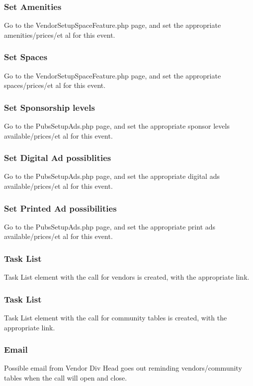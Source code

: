 \documentclass[captions=tablesignature]{scrartcl}
\begin{document}
\subsubsection{Set Amenities}
\label{sec-3-2-1}
Go to the VendorSetupSpaceFeature.php page, and set the
appropriate amenities/prices/et al for this event.

\subsubsection{Set Spaces}
\label{sec-3-2-2}
Go to the VendorSetupSpaceFeature.php page, and set the
appropriate spaces/prices/et al for this event.

\subsubsection{Set Sponsorship levels}
\label{sec-3-2-3}
Go to the PubsSetupAds.php page, and set the
appropriate sponsor levels available/prices/et al for this event.

\subsubsection{Set Digital Ad possiblities}
\label{sec-3-2-4}
Go to the PubsSetupAds.php page, and set the
appropriate digital ads available/prices/et al for this event.

\subsubsection{Set Printed Ad possibilities}
\label{sec-3-2-5}
Go to the PubsSetupAds.php page, and set the
appropriate print ads available/prices/et al for this event.

\subsubsection{Task List}
\label{sec-3-2-6}
Task List element with the call for vendors is created, with the
appropriate link.

\subsubsection{Task List}
\label{sec-3-2-7}
Task List element with the call for community tables is created,
with the appropriate link.

\subsubsection{Email}
\label{sec-3-2-8}
Possible email from Vendor Div Head goes out reminding
vendors/community tables when the call will open and close.
\end{document}
